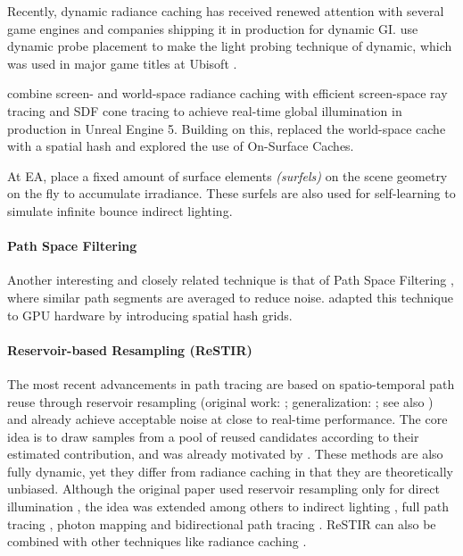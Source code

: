 Recently, dynamic radiance caching has received renewed attention with several game engines and companies shipping it in production for dynamic GI.
\textcite{majercik2019} use dynamic probe placement to make the light probing technique of \textcite{mcguire2017} dynamic, which was used in major game titles at Ubisoft \parencite{kuenlin2024}.

\textcite{wright2021,wright2022} combine screen- and world-space radiance caching with efficient screen-space ray tracing and SDF cone tracing to achieve real-time global illumination in production in Unreal Engine 5.
Building on this, \textcite{boisse2023} replaced the world-space cache with a spatial hash and \textcite{tatzgern2024} explored the use of On-Surface Caches.

At EA, \textcite{stachowiak2018,halen2021,apers2024} place a fixed amount of surface elements \emph{(surfels)} on the scene geometry on the fly to accumulate irradiance.
These surfels are also used for self-learning to simulate infinite bounce indirect lighting.

\paragraph{Path Space Filtering}
Another interesting and closely related technique is that of Path Space Filtering \parencite{keller2016}, where similar path segments are averaged to reduce noise.
\textcite{binder2021} adapted this technique to GPU hardware by introducing spatial hash grids.

\paragraph{Reservoir-based Resampling (ReSTIR)}
The most recent advancements in path tracing are based on spatio-temporal path reuse through reservoir resampling (original work: \cite{bitterli2020}; generalization: \cite{lin2022}; see also \cite{wyman2023}) and already achieve acceptable noise at close to real-time performance.
The core idea is to draw samples from a pool of reused candidates according to their estimated contribution, and was already motivated by \textcite{talbot2005}.
These methods are also fully dynamic, yet they differ from radiance caching in that they are theoretically unbiased.
Although the original paper used reservoir resampling only for direct illumination \parencite{bitterli2020}, the idea was extended among others to indirect lighting \parencite{ouyang2021}, full path tracing \parencite{lin2022}, photon mapping \parencite{kern2024} and bidirectional path tracing \parencite{hedstrom2025}.
ReSTIR can also be combined with other techniques like radiance caching \parencite{muller2021,majercik2021,boisse2023}.

